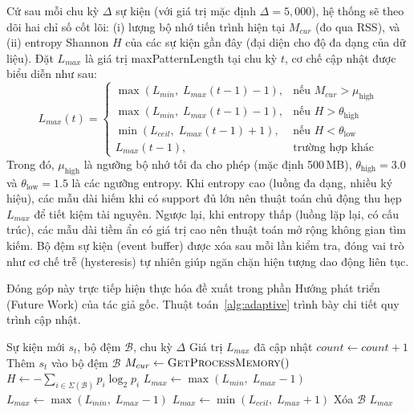\documentclass[conference]{IEEEtran}
\begin{document}
Cứ sau mỗi chu kỳ $\Delta$ sự kiện (với giá trị mặc định $\Delta = 5{,}000$), hệ thống sẽ theo dõi hai chỉ số cốt lõi: (i) lượng bộ nhớ tiến trình hiện tại $M_{cur}$ (đo qua RSS), và (ii) entropy Shannon $H$ của các sự kiện gần đây (đại diện cho độ đa dạng của dữ liệu). Đặt $L_{max}$ là giá trị maxPatternLength tại chu kỳ $t$, cơ chế cập nhật được biểu diễn như sau:
\begin{equation}
    L_{max}(t) = \begin{cases} 
      \max(L_{min},\; L_{max}(t\!-\!1) - 1), & \text{nếu } M_{cur} > \mu_{\text{high}} \\
      \max(L_{min},\; L_{max}(t\!-\!1) - 1), & \text{nếu } H > \theta_{\text{high}} \\
      \min(L_{ceil},\; L_{max}(t\!-\!1) + 1), & \text{nếu } H < \theta_{\text{low}} \\
      L_{max}(t\!-\!1), & \text{trường hợp khác}
   \end{cases}
\end{equation}
Trong đó, $\mu_{\text{high}}$ là ngưỡng bộ nhớ tối đa cho phép (mặc định 500\,MB), $\theta_{\text{high}} = 3.0$ và $\theta_{\text{low}} = 1.5$ là các ngưỡng entropy. Khi entropy cao (luồng đa dạng, nhiều ký hiệu), các mẫu dài hiếm khi có support đủ lớn nên thuật toán chủ động thu hẹp $L_{max}$ để tiết kiệm tài nguyên. Ngược lại, khi entropy thấp (luồng lặp lại, có cấu trúc), các mẫu dài tiềm ẩn có giá trị cao nên thuật toán mở rộng không gian tìm kiếm. Bộ đệm sự kiện (event buffer) được xóa sau mỗi lần kiểm tra, đóng vai trò như cơ chế trễ (hysteresis) tự nhiên giúp ngăn chặn hiện tượng dao động liên tục. 

Đóng góp này trực tiếp hiện thực hóa đề xuất trong phần Hướng phát triển (Future Work) của tác giả gốc. Thuật toán~\ref{alg:adaptive} trình bày chi tiết quy trình cập nhật.

\begin{algorithm}[htbp]
\caption{Cập nhật maxPatternLength Thích ứng}
\label{alg:adaptive}
\begin{algorithmic}[1]
\REQUIRE Sự kiện mới $s_t$, bộ đệm $\mathcal{B}$, chu kỳ $\Delta$
\ENSURE Giá trị $L_{max}$ đã cập nhật
\STATE $\textit{count} \leftarrow \textit{count} + 1$
\STATE Thêm $s_t$ vào bộ đệm $\mathcal{B}$
    \STATE $M_{cur} \leftarrow \textsc{GetProcessMemory}()$ 
    \STATE $H \leftarrow -\sum_{i \in \Sigma(\mathcal{B})} p_i \log_2 p_i$ 
        \STATE $L_{max} \leftarrow \max(L_{min},\; L_{max} - 1)$ 
        \STATE $L_{max} \leftarrow \max(L_{min},\; L_{max} - 1)$ 
        \STATE $L_{max} \leftarrow \min(L_{ceil},\; L_{max} + 1)$ 
    \ENDIF
    \STATE Xóa $\mathcal{B}$ 
\ENDIF
\RETURN $L_{max}$
\end{algorithmic}
\end{algorithm}
\end{document}
